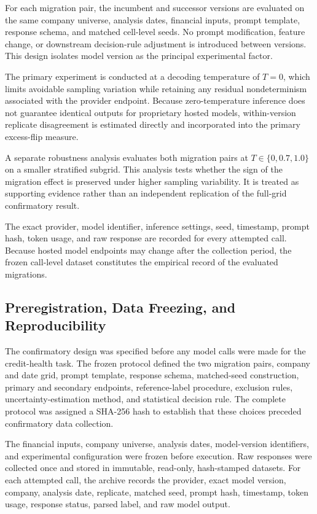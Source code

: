 \documentclass{ieeeaccess}
\begin{document}
For each migration pair, the incumbent and successor versions are evaluated on the same company universe, analysis dates, financial inputs, prompt template, response schema, and matched cell-level seeds. No prompt modification, feature change, or downstream decision-rule adjustment is introduced between versions. This design isolates model version as the principal experimental factor.

The primary experiment is conducted at a decoding temperature of $T=0$, which limits avoidable sampling variation while retaining any residual nondeterminism associated with the provider endpoint. Because zero-temperature inference does not guarantee identical outputs for proprietary hosted models, within-version replicate disagreement is estimated directly and incorporated into the primary excess-flip measure.

A separate robustness analysis evaluates both migration pairs at $T\in\{0,0.7,1.0\}$ on a smaller stratified subgrid. This analysis tests whether the sign of the migration effect is preserved under higher sampling variability. It is treated as supporting evidence rather than an independent replication of the full-grid confirmatory result.

The exact provider, model identifier, inference settings, seed, timestamp, prompt hash, token usage, and raw response are recorded for every attempted call. Because hosted model endpoints may change after the collection period, the frozen call-level dataset constitutes the empirical record of the evaluated migrations.

\subsection{Preregistration, Data Freezing, and Reproducibility}
\label{subsec:freeze}
The confirmatory design was specified before any model calls were made for the credit-health task. The frozen protocol defined the two migration pairs, company and date grid, prompt template, response schema, matched-seed construction, primary and secondary endpoints, reference-label procedure, exclusion rules, uncertainty-estimation method, and statistical decision rule. The complete protocol was assigned a SHA-256 hash to establish that these choices preceded confirmatory data collection.

The financial inputs, company universe, analysis dates, model-version identifiers, and experimental configuration were frozen before execution. Raw responses were collected once and stored in immutable, read-only, hash-stamped datasets. For each attempted call, the archive records the provider, exact model version, company, analysis date, replicate, matched seed, prompt hash, timestamp, token usage, response status, parsed label, and raw model output.
\end{document}
